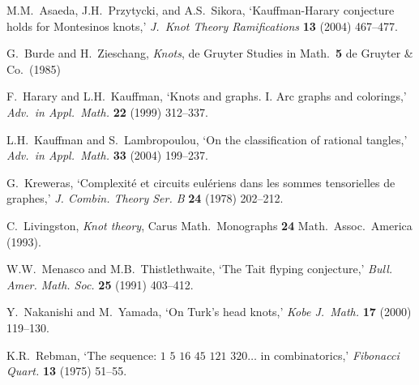 \documentclass{amsart}
\begin{document}
\begin{thebibliography}{APS}

 M.M.\ Asaeda, J.H.\ Przytycki, and A.S.\ Sikora, `Kauffman-{H}arary conjecture holds for {M}ontesinos knots,' {\em J.\ Knot Theory Ramifications} {\bf 13} (2004) 467--477.

 G.\ Burde and H.\ Zieschang, {\em Knots}, de Gruyter Studies in Math.\ {\bf 5} de Gruyter \& Co.\ (1985)

 F.\ Harary and L.H.\ Kauffman, `Knots and graphs. {I}. {A}rc graphs and colorings,' {\em Adv.\ in Appl.\ Math.} {\bf 22} (1999) 312--337.

 L.H.\ Kauffman and S.\ Lambropoulou, `On the classification of rational tangles,' {\em Adv.\ in Appl.\ Math.} {\bf 33} (2004) 199--237.

 G.\ Kreweras, `Complexit\'e et circuits eul\'eriens dans les sommes tensorielles de graphes,' {\em J. Combin. Theory Ser. B} {\bf 24}
(1978) 202--212.

 C.\ Livingston, {\em Knot theory}, Carus Math.\ Monographs {\bf 24} Math.\ Assoc.\ America (1993).

 W.W.\ Menasco and M.B.\ Thistlethwaite, `The {T}ait flyping conjecture,' {\em Bull. Amer. Math. Soc.} {\bf 25} (1991) 403--412.

 Y.\ Nakanishi and M.\ Yamada, `On {T}urk's head knots,'
{\em Kobe J.\ Math.} {\bf 17} (2000) 119--130.

 K.R.\ Rebman, `The sequence: {$1$} {$5$} {$16$} {$45$} {$121$} {$320\ldots $} in combinatorics,' {\em Fibonacci Quart.} {\bf 13} (1975)
51--55.

\end{thebibliography}
\end{document}
